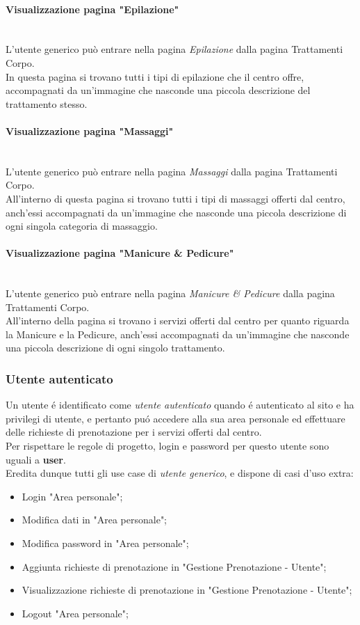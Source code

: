 \documentclass{article}
\begin{document}
\paragraph{Visualizzazione pagina "Epilazione"}\mbox{}\\
L'utente generico può entrare nella pagina \textit{Epilazione} dalla pagina Trattamenti Corpo.\\
In questa pagina si trovano tutti i tipi di epilazione che il centro offre, accompagnati da un'immagine che nasconde una piccola descrizione del trattamento stesso.

\paragraph{Visualizzazione pagina "Massaggi"}\mbox{}\\
L'utente generico può entrare nella pagina \textit{Massaggi} dalla pagina Trattamenti Corpo.\\
All'interno di questa pagina si trovano tutti i tipi di massaggi offerti dal centro, anch'essi accompagnati da un'immagine che nasconde una piccola descrizione di ogni singola categoria di massaggio.

\paragraph{Visualizzazione pagina "Manicure \& Pedicure"}\mbox{}\\
L'utente generico può entrare nella pagina \textit{Manicure \& Pedicure} dalla pagina Trattamenti Corpo.\\
All'interno della pagina si trovano i servizi offerti dal centro per quanto riguarda la Manicure e la Pedicure, anch'essi accompagnati da un'immagine che nasconde una piccola descrizione di ogni singolo trattamento.

\subsubsection{Utente autenticato}
Un utente é identificato come \textit{utente autenticato} quando é autenticato al sito e ha privilegi di utente, e pertanto puó accedere alla sua area personale ed effettuare delle richieste di prenotazione per i servizi offerti dal centro.\\
Per rispettare le regole di progetto, login e password per questo utente sono uguali a \textbf{user}.\\
Eredita dunque tutti gli use case di \textit{utente generico}, e dispone di casi d'uso extra:
\begin{itemize}
	\item Login "Area personale";
	\item Modifica dati in "Area personale";
	\item Modifica password in "Area personale";
	\item Aggiunta richieste di prenotazione in "Gestione Prenotazione - Utente";
	\item Visualizzazione richieste di prenotazione in "Gestione Prenotazione - Utente";
	\item Logout "Area personale";
\end{itemize}
\end{document}
